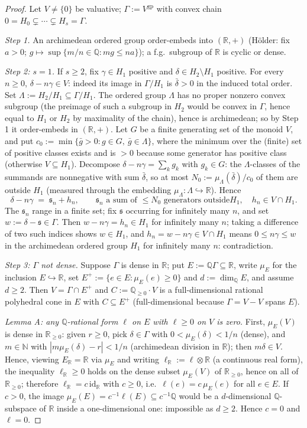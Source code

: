 \documentclass[11pt]{article}
\theoremstyle{definition}
\newcommand{\gp}{\mathrm{gp}}
\newcommand{\N}{\mathbb{N}}
\newcommand{\Q}{\mathbb{Q}}
\newcommand{\R}{\mathbb{R}}
\begin{document}
\begin{proof}
Let $V\ne\{0\}$ be valuative; $\Gamma:=V^{\gp}$ with convex chain
$0=H_0\subsetneq\cdots\subsetneq H_s=\Gamma$.

\emph{Step 1.} An archimedean ordered group order-embeds into
$(\R,+)$ (H\"older: fix $a>0$; $g\mapsto\sup\{m/n\in\Q:mg\le na\}$);
a f.g.\ subgroup of $\R$ is cyclic or dense.

\emph{Step 2: $s=1$.} If $s\ge2$, fix $\gamma\in H_1$ positive
and $\delta\in H_2\setminus H_1$ positive. For every $n\ge0$,
$\delta-n\gamma\in V$: indeed its image in $\Gamma/H_1$ is
$\bar\delta>0$ in the induced total order. Set
$\Lambda:=H_2/H_1\subseteq\Gamma/H_1$. The ordered group $\Lambda$
has no proper nonzero convex subgroup (the preimage of such a
subgroup in $H_2$ would be convex in $\Gamma$, hence equal to $H_1$
or $H_2$ by maximality of the chain), hence is archimedean; so by
Step 1 it order-embeds in $(\R,+)$. Let $G$ be a finite generating
set of the monoid $V$, and put
$c_0:=\min\{\bar g>0:g\in G,\ \bar g\in\Lambda\}$, where the minimum
over the (finite) set of positive classes exists and is $>0$
because some generator has positive class (otherwise
$V\subseteq H_1$).
Decompose $\delta-n\gamma=\sum_k g_k$ with $g_k\in G$: the
$\Lambda$-classes of the summands are nonnegative with sum
$\bar\delta$, so at most $N_0:=\mu_\Lambda(\bar\delta)/c_0$ of them are
outside $H_1$ (measured through the embedding
$\mu_\Lambda:\Lambda\hookrightarrow\R$). Hence
\[
\delta-n\gamma \;=\; \mathfrak s_n+h_n,\qquad
\mathfrak s_n\text{ a sum of }\le N_0\text{ generators outside
}H_1,\quad h_n\in V\cap H_1 .
\]
The $\mathfrak s_n$ range in a finite set; fix $\mathfrak s$
occurring for infinitely many $n$, and set $w:=\delta-\mathfrak
s\in\Gamma$. Then $w-n\gamma=h_n\in H_1$ for infinitely many $n$;
taking a difference of two such indices shows $w\in H_1$, and
$h_n=w-n\gamma\in V\cap H_1$ means $0\le n\gamma\le w$ in the
archimedean ordered group $H_1$ for infinitely many $n$:
contradiction.


\emph{Step 3: $\Gamma$ not dense.} Suppose $\Gamma$ is dense in
$\R$; put $E:=\Q\Gamma\subseteq\R$, write $\mu_E$ for the inclusion
$E\hookrightarrow\R$, set $E^+:=\{e\in E:\mu_E(e)\ge0\}$ and
$d:=\dim_{\Q}E$, and assume $d\ge2$. Then $V=\Gamma\cap E^+$ and
$C:=\Q_{\ge0}\cdot V$ is a full-dimensional rational polyhedral
cone in $E$ with $C\subseteq E^+$ (full-dimensional because
$\Gamma=V-V$ spans $E$).

\emph{Lemma A: any $\Q$-rational form $\ell$ on $E$ with
$\ell\ge0$ on $V$ is zero.} First, $\mu_E(V)$ is dense in
$\R_{\ge0}$: given $r\ge0$, pick $\delta\in\Gamma$ with
$0<\mu_E(\delta)<1/n$ (dense), and $m\in\N$ with
$|m\mu_E(\delta)-r|<1/n$ (archimedean division in $\R$); then
$m\delta\in V$. Hence, viewing $E_{\R}=\R$ via $\mu_E$ and writing
$\ell_{\R}:=\ell\otimes\R$ (a continuous real form), the
inequality $\ell_{\R}\ge0$ holds on the dense subset
$\mu_E(V)$ of $\R_{\ge0}$, hence on all of $\R_{\ge0}$; therefore
$\ell_{\R}=c\,\mathrm{id}_{\R}$ with $c\ge0$, i.e.\
$\ell(e)=c\,\mu_E(e)$ for all $e\in E$. If $c>0$, the image
$\mu_E(E)=c^{-1}\ell(E)\subseteq c^{-1}\Q$ would be a
$d$-dimensional $\Q$-subspace of $\R$ inside a one-dimensional
one: impossible as $d\ge2$. Hence $c=0$ and $\ell=0$.


\end{proof}
\end{document}
